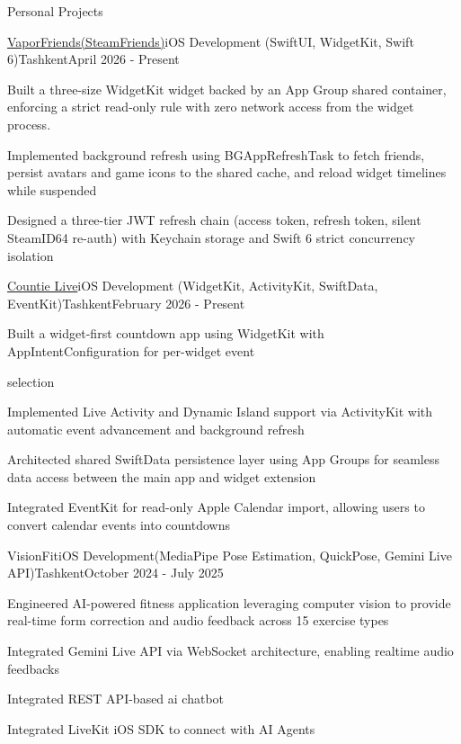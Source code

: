\begin{resume_section}{Personal Projects}

\begin{resume_employer}{\href{https://apps.apple.com/us/app/vaporfriends/id6762462173}{VaporFriends(SteamFriends)}}{iOS Development (SwiftUI, WidgetKit, Swift 6)}{Tashkent}{April 2026 - Present}

\item Built a three-size WidgetKit widget backed by an App Group shared container, enforcing a strict read-only rule with zero network access from the widget process.
\item Implemented background refresh using BGAppRefreshTask to fetch friends, persist avatars and game icons to the shared cache, and reload widget timelines while suspended        
\item Designed a three-tier JWT refresh chain (access token, refresh token, silent SteamID64 re-auth) with Keychain storage and Swift 6 strict concurrency isolation
  
\end{resume_employer} 

\begin{resume_employer}{\href{https://apps.apple.com/us/app/countie-live/id6761603292}{Countie Live}}{iOS Development (WidgetKit, ActivityKit, SwiftData, EventKit)}{Tashkent}{February 2026 - Present}
  \item Built a widget-first countdown app using WidgetKit with AppIntentConfiguration for per-widget event 
  
  selection
  \item Implemented Live Activity and Dynamic Island support via ActivityKit with automatic event advancement and background refresh                                                                                                              
  \item Architected shared SwiftData persistence layer using App Groups for seamless data access between the main app and widget extension
  \item Integrated EventKit for read-only Apple Calendar import, allowing users to convert calendar events into countdowns 
\end{resume_employer} 

\begin{resume_employer}{VisionFit}{iOS Development(MediaPipe Pose Estimation, QuickPose, Gemini Live API)}{Tashkent}{October 2024 - July 2025}
\item Engineered AI-powered fitness application leveraging computer vision to provide real-time form correction and audio feedback across 15 exercise types
\item Integrated Gemini Live API via WebSocket architecture, enabling realtime audio feedbacks
\item Integrated REST API-based ai chatbot
\item Integrated LiveKit iOS SDK to connect with AI Agents
\end{resume_employer}


\end{resume_section}
